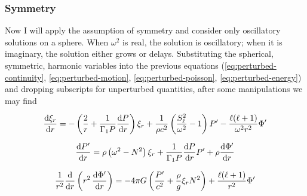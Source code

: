 \subsubsection*{Symmetry}
Now I will apply the assumption of symmetry and consider only oscillatory solutions on a sphere. 
When $\omega^2$ is real, the solution is oscillatory; when it is imaginary, the solution either grows or delays. 
Substituting the spherical, symmetric, harmonic variables into the previous equations (\ref{eq:perturbed-continuity}, \ref{eq:perturbed-motion}, \ref{eq:perturbed-poisson}, \ref{eq:perturbed-energy}) and dropping subscripts for unperturbed quantities, after some manipulations we may find 
\begin{gather} \label{eq:oscillation1}
    \frac{\text{d}\xi_r}{\text{d}r}
    =
    -\left(
        \frac{2}{r}
        +
        \frac{1}{\Gamma_1 P}
        \frac{\text{d}P}{\text{d}r}
    \right)
    \xi_r
    +
    \frac{1}{\rho c^2}
    \left(
        \frac{S_\ell^2}{\omega^2}
        -
        1
    \right)
    P'
    -
    \frac{\ell(\ell+1)}{\omega^2 r^2}
    \Phi' \vphantom{\Bigg(}
    \\
    \frac{\text{d}P'}{\text{d}r}
    =
    \rho \left(
        \omega^2 - N^2
    \right) 
    \xi_r
    +
    \frac{1}{\Gamma_1 P}
    \frac{\text{d}P}{\text{d}r}
    P'
    +
    \rho \frac{\text{d} \Phi'}{\text{d} r}
    \vphantom{\Bigg(}
    \\
    \frac{1}{r^2}
    \frac{\text{d}}{\text{d}r}
    \left(
        r^2\,
        \frac{\text{d}\Phi'}{\text{d}r}
    \right)
    =
    -4\pi G \left(
        \frac{P'}{c^2}
        +
        \frac{\rho}{g}
        \xi_r
        N^2
    \right)
    +
    \frac{\ell(\ell+1)}{r^2}
    \Phi' \vphantom{\Bigg(}
    \label{eq:oscillation3}
\end{gather}%
